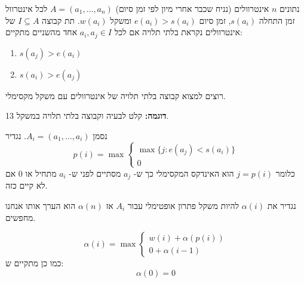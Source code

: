 נתונים $n$ אינטרוולים (נניח שכבר אחרי מיון לפי זמן סיום)
$A = (a_1,\ldots,a_n)$
לכל אינטרוול זמן התחלה 
$s(a_i)$,
זמן סיום
$e(a_i) > s(a_i)$
ומשקל
$w(a_i)$.
תת קבוצה 
$I \subseteq A$
של אינטרוולים  נקראת בלתי תלויה אם לכל 
$a_i, a_j \in I$
אחד מהשניים מתקיים:
\begin{enumerate}
\item
$s(a_j) > e(a_i)$
\item
$s(a_i) > e(a_j)$
\end{enumerate}

רוצים למצוא קבוצה בלתי תלויה של אינטרוולים עם משקל מקסימלי.

\textbf{דוגמה:}
קלט לבעיה וקבוצה בלתי תלויה במשקל 13.
\begin{center}
\end{center}


נסמן 
$A_i = (a_1,\ldots,a_i)$.
נגדיר
$$p(i) = \max
\begin{cases}
\max \{j : e(a_j) < s(a_i)\}
\\
0
\end{cases}
$$
כלומר 
$j = p(i)$
הוא האינדקס המקסימלי כך ש-%
$a_j$
מסתיים לפני ש-%
$a_i$
מתחיל או 0 אם לא קיים כזה.

נגדיר את 
$\alpha(i)$
להיות משקל פתרון אופטימלי עבור
$A_i$
אז
$\alpha(n)$
הוא הערך אותו אנחנו מחפשים.

\begin{claim}
$$
\alpha(i) = \max
\begin{cases}
w(i) + \alpha(p(i))
\\
0 + \alpha(i - 1)
\end{cases}
$$
כמו כן מתקיים ש:
$$\alpha(0) = 0$$
\end{claim}

